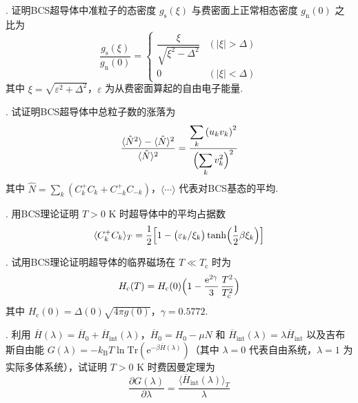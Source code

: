 {.} 证明BCS超导体中准粒子的态密度 $g_{\mathrm{s}}(\xi)$ 与费密面上正常相态密度 $g_{\mathrm{n}}(0)$ 之比为
\begin{equation*}
  \frac{g_{\mathrm{s}}(\xi)}{g_{\mathrm{n}}(0)}=
  \begin{cases}
    \dfrac{\xi}{\sqrt{\xi^{2}-\Delta^{2}}} & \left(\left|\xi\right|>\Delta\right)\\[0.8em]
    0 & \left(\left|\xi\right|<\Delta\right)
  \end{cases}
\end{equation*}
其中 $\xi=\sqrt{\varepsilon^{2}+\Delta^{2}}$，$\varepsilon$ 为从费密面算起的自由电子能量.

{.} 试证明BCS超导体中总粒子数的涨落为
\begin{equation*}
  \frac{\langle\hat{N}^{2}\rangle-\langle\hat{N}\rangle^{2}}{\langle\hat{N}\rangle^{2}}
  =\frac{\displaystyle\sum_{k}\left(u_{k}v_{k}\right)^{2}}{\Bigl(\displaystyle\sum_{k}v_{k}^{2}\Bigr)^{2}}
\end{equation*}
其中 $\hat{N}=\sum_{k}\left(C^{+}_{k}C_{k}+C^{+}_{-k}C_{-k}\right)$，$\langle\cdots\rangle$ 代表对BCS基态的平均.

{.} 用BCS理论证明 $T>0$ K 时超导体中的平均占据数
\begin{equation*}
  \langle C^{+}_{k}C_{k}\rangle_{T}=\frac{1}{2}\Bigl[1-\bigl(\varepsilon_{k}/\xi_{k}\bigr)\tanh\Bigl(\frac{1}{2}\beta\xi_{k}\Bigr)\Bigr]
\end{equation*}

{.} 试用BCS理论证明超导体的临界磁场在 $T\ll T_{\mathrm{c}}$ 时为
\begin{equation*}
  H_{\mathrm{c}}(T)=H_{\mathrm{c}}(0)\Bigl(1-\frac{\mathrm{e}^{2\gamma}}{3}\,\frac{T^{2}}{T_{\mathrm{c}}^{2}}\Bigr)
\end{equation*}
其中 $H_{\mathrm{c}}(0)=\Delta(0)\sqrt{4\pi g(0)}$，$\gamma=0.5772$.

{.} 利用 $\overline{H}(\lambda)=\overline{H}_{0}+\overline{H}_{\mathrm{int}}(\lambda)$，$\overline{H}_{0}=H_{0}-\mu N$ 和 $\overline{H}_{\mathrm{int}}(\lambda)=\lambda\overline{H}_{\mathrm{int}}$ 以及吉布斯自由能 $G(\lambda)=-k_{\mathrm{B}}T\ln\mathrm{Tr}\left(\mathrm{e}^{-\beta\overline{H}(\lambda)}\right)$（其中 $\lambda=0$ 代表自由系统，$\lambda=1$ 为实际多体系统），试证明 $T>0$ K 时费因曼定理为
\begin{equation*}
  \frac{\partial G(\lambda)}{\partial\lambda}
  =\frac{\bigl\langle\overline{H}_{\mathrm{int}}(\lambda)\bigr\rangle_{T}}{\lambda}
\end{equation*}


